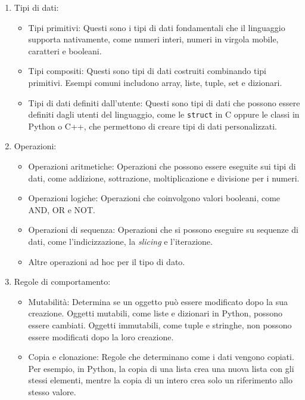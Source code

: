 \documentclass[
  letterpaper,
]{scrbook}
\begin{document}
\begin{enumerate}
\def\labelenumi{\arabic{enumi}.}
\item
  Tipi di dati:

  \begin{itemize}
  \item
    Tipi primitivi: Questi sono i tipi di dati fondamentali che il
    linguaggio supporta nativamente, come numeri interi, numeri in
    virgola mobile, caratteri e booleani.
  \item
    Tipi compositi: Questi sono tipi di dati costruiti combinando tipi
    primitivi. Esempi comuni includono array, liste, tuple, set e
    dizionari.
  \item
    Tipi di dati definiti dall'utente: Questi sono tipi di dati che
    possono essere definiti dagli utenti del linguaggio, come le
    \texttt{struct} in C oppure le classi in Python o C++, che
    permettono di creare tipi di dati personalizzati.
  \end{itemize}
\item
  Operazioni:

  \begin{itemize}
  \item
    Operazioni aritmetiche: Operazioni che possono essere eseguite sui
    tipi di dati, come addizione, sottrazione, moltiplicazione e
    divisione per i numeri.
  \item
    Operazioni logiche: Operazioni che coinvolgono valori booleani, come
    AND, OR e NOT.
  \item
    Operazioni di sequenza: Operazioni che si possono eseguire su
    sequenze di dati, come l'indicizzazione, la \emph{slicing} e
    l'iterazione.
  \item
    Altre operazioni ad hoc per il tipo di dato.
  \end{itemize}
\item
  Regole di comportamento:

  \begin{itemize}
  \item
    Mutabilità: Determina se un oggetto può essere modificato dopo la
    sua creazione. Oggetti mutabili, come liste e dizionari in Python,
    possono essere cambiati. Oggetti immutabili, come tuple e stringhe,
    non possono essere modificati dopo la loro creazione.
  \item
    Copia e clonazione: Regole che determinano come i dati vengono
    copiati. Per esempio, in Python, la copia di una lista crea una
    nuova lista con gli stessi elementi, mentre la copia di un intero
    crea solo un riferimento allo stesso valore.
  \end{itemize}
\end{enumerate}
\end{document}
